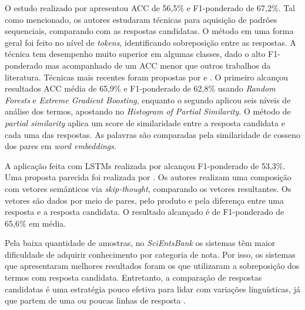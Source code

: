 O estudo realizado por \cite{roy2016} apresentou ACC de 56,5\% e F1-ponderado de 67,2\%. Tal como mencionado, os autores estudaram técnicas para aquisição de padrões sequenciais, comparando com as respostas candidatas. O método em uma forma geral foi feito no nível de \textit{tokens}, identificando sobreposição entre as respostas. A técnica tem desempenho muito superior em algumas classes, dado o alto F1-ponderado mas acompanhado de um ACC menor que outros trabalhos da literatura. Técnicas mais recentes foram propostas por \cite{galhardi2018c} e \cite{saha2018}. O primeiro alcançou resultados ACC média de 65,9\% e F1-ponderado de 62,8\% usando \textit{Random Forests} e \textit{Extreme Gradient Boosting}, enquanto o segundo aplicou seis níveis de análise dos termos, apostando no \textit{Histogram of Partial Similarity}. O método de \textit{partial similarity} aplica um score de similaridade entre a resposta candidata e cada uma das respostas. As palavras são comparadas pela similaridade de cosseno dos pares em \textit{word embeddings}. 

A aplicação feita com LSTMs realizada por \cite{riordan2017} alcançou F1-ponderado de 53,3\%. Uma proposta parecida foi realizada por \cite{gomaa2019}. Os autores realizam uma composição com vetores semânticos via \textit{skip-thought}, comparando os vetores resultantes. Os vetores são dados por meio de pares, pelo produto e pela diferença entre uma resposta e a resposta candidata. O resultado alcançado é de F1-ponderado de 65,6\% em média. 

Pela baixa quantidade de amostras, no \textit{SciEntsBank} os sistemas têm maior dificuldade de adquirir conhecimento por categoria de nota. Por isso, os sistemas que apresentaram melhores resultados foram os que utilizaram a sobreposição dos termos com resposta candidata. Entretanto, a comparação de respostas candidatas é uma estratégia pouco efetiva para lidar com variações linguísticas, já que partem de uma ou poucas linhas de resposta \cite{filighera2020}.

